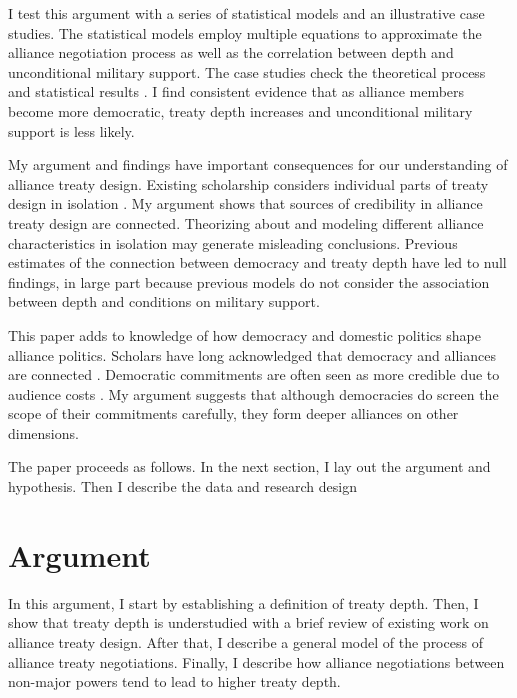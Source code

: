 \documentclass[12pt]{article}
\begin{document}
I test this argument with a series of statistical models and an illustrative case studies.
The statistical models employ multiple equations to approximate the alliance negotiation process as well as the correlation between depth and unconditional military support. 
The case studies check the theoretical process and statistical results \citep{SeawrightGerring2008, Seawright2016}. 
I find consistent evidence that as alliance members become more democratic, treaty depth increases and unconditional military support is less likely. 


My argument and findings have important consequences for our understanding of alliance treaty design. 
Existing scholarship considers individual parts of treaty design in isolation \citep{Benson2012, Mattes2012, Chibaetal2015}. 
My argument shows that sources of credibility in alliance treaty design are connected. 
Theorizing about and modeling different alliance characteristics in isolation may generate misleading conclusions. 
Previous estimates of the connection between democracy and treaty depth have led to null findings, in large part because previous models do not consider the association between depth and conditions on military support. 


This paper adds to knowledge of how democracy and domestic politics shape alliance politics. 
Scholars have long acknowledged that democracy and alliances are connected \citep{LaiReiter2000, GiblerWolford2006, Warren2016, McManusYarhi-Milo2017}. 
Democratic commitments are often seen as more credible due to audience costs \citep{DigiuseppePoast2016}. 
My argument suggests that although democracies do screen the scope of their commitments carefully, they form deeper alliances on other dimensions.  



The paper proceeds as follows. 
In the next section, I lay out the argument and hypothesis. 
Then I describe the data and research design 


\section{Argument}


In this argument, I start by establishing a definition of treaty depth. 
Then, I show that treaty depth is understudied with a brief review of existing work on alliance treaty design. 
After that, I describe a general model of the process of alliance treaty negotiations. 
Finally, I describe how alliance negotiations between non-major powers tend to lead to higher treaty depth. 
\end{document}

